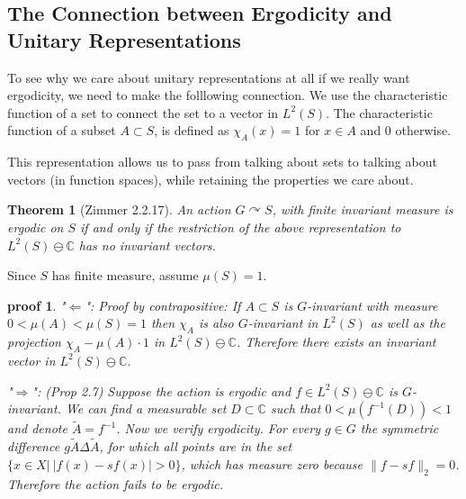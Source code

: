 \documentclass[
  12pt
]{article}
\newtheorem{thm}{Theorem}[section]
\theoremstyle{plain}
\newtheorem*{pf}{proof}
\begin{document}
  \hypertarget{the-connection-between-ergodicity-and-unitary-representations}{%
  \subsection{The Connection between Ergodicity and Unitary Representations}\label{the-connection-between-ergodicity-and-unitary-representations}}

  To see why we care about unitary representations at all if we really
  want ergodicity, we need to make the folllowing connection. We use the
  characteristic function of a set to connect the set to a vector in
  $L^2(S)$. The characteristic function of a subset $A\subset S$, is
  defined as $\chi_A(x) = 1$ for $x \in A$ and $0$ otherwise.

  This representation allows us to pass from talking about sets to talking
  about vectors (in function spaces), while retaining the properties we care
  about.

  \begin{thm}[Zimmer 2.2.17]
    \label{thm:2.2.17}
    An action $G\curvearrowright S$, with \emph{ finite } invariant measure is
    ergodic on $S$ if and only if the restriction of the above representation
    to $L^2(S) \ominus \mathbb{C}$ has no invariant vectors.
  \end{thm}
    
  Since $S$ has finite measure, assume $\mu(S) =1$.

  \begin{pf}

    "$\Leftarrow$": Proof by contrapositive:
    If $A\subset S$ is $G$-invariant
    with measure $0 < \mu(A) < \mu(S) = 1$ then $\chi_A$ is also $G$-invariant
    in $L^2(S)$ as well as the projection $\chi_A - \mu(A)\cdot 1$ in
    $L^2(S)\ominus \mathbb{C}$. Therefore there exists an invariant vector in
    $L^2(S)\ominus \mathbb{C}$.

    "$\Rightarrow$": \cite{Kerr16}(Prop 2.7)
    Suppose the action is ergodic and $f\in L^2(S)\ominus \mathbb{C}$ is
    $G$-invariant. We can find a measurable set $D\subset \mathbb{C}$ such that
    $0<\mu(f^{-1}(D)) < 1$ and denote $\widetilde{A} = f^{-1}$. Now we verify
    ergodicity. For every $g\in G$ the symmetric difference $g\widetilde{A}
    \Delta \widetilde{A}$, for which all points are in the set $\{x \in X | \
    |f(x)-sf(x)| > 0\}$, which has measure zero because $\|f- sf\|_2=0$.
    Therefore the action fails to be ergodic.
  \end{pf}
\end{document}
